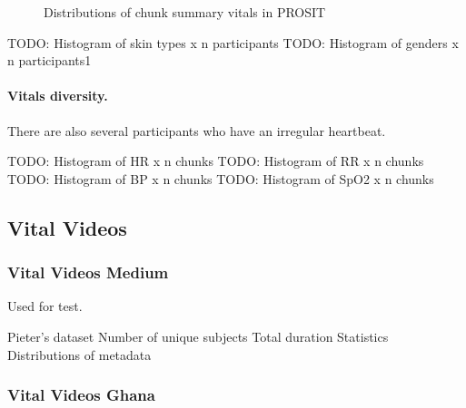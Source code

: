 \documentclass{article}
\begin{document}
\begin{figure}[h!]
\begin{subfigure}{0.48\textwidth}
\begin{tikzpicture}
    	\end{tikzpicture}
    \end{subfigure}
    \hfill
    \begin{subfigure}{0.48\textwidth}
    	\centering
    \end{subfigure}
    \caption{Distributions of chunk summary vitals in PROSIT}
    \label{fig:histogram}
\end{figure}

TODO: Histogram of skin types x n participants
TODO: Histogram of genders x n participants1 

\paragraph{Vitals diversity.}
There are also several participants who have an irregular heartbeat.

TODO: Histogram of HR x n chunks
TODO: Histogram of RR x n chunks
TODO: Histogram of BP x n chunks
TODO: Histogram of SpO2 x n chunks

\subsection{Vital Videos}

\subsubsection{Vital Videos Medium}

Used for test.

Pieter's dataset
Number of unique subjects
Total duration
Statistics
Distributions of metadata

\subsubsection{Vital Videos Ghana}
\end{document}
